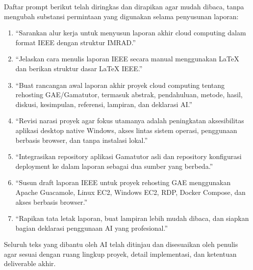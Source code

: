 \documentclass[conference]{IEEEtran}
\begin{document}
Daftar prompt berikut telah diringkas dan dirapikan agar mudah dibaca, tanpa mengubah substansi permintaan yang digunakan selama penyusunan laporan:

\begin{enumerate}
    \item ``Sarankan alur kerja untuk menyusun laporan akhir cloud computing dalam format IEEE dengan struktur IMRAD.''
    \item ``Jelaskan cara menulis laporan IEEE secara manual menggunakan LaTeX dan berikan struktur dasar LaTeX IEEE.''
    \item ``Buat rancangan awal laporan akhir proyek cloud computing tentang rehosting GAE/Gamatutor, termasuk abstrak, pendahuluan, metode, hasil, diskusi, kesimpulan, referensi, lampiran, dan deklarasi AI.''
    \item ``Revisi narasi proyek agar fokus utamanya adalah peningkatan aksesibilitas aplikasi desktop native Windows, akses lintas sistem operasi, penggunaan berbasis browser, dan tanpa instalasi lokal.''
    \item ``Integrasikan repository aplikasi Gamatutor asli dan repository konfigurasi deployment ke dalam laporan sebagai dua sumber yang berbeda.''
    \item ``Susun draft laporan IEEE untuk proyek rehosting GAE menggunakan Apache Guacamole, Linux EC2, Windows EC2, RDP, Docker Compose, dan akses berbasis browser.''
    \item ``Rapikan tata letak laporan, buat lampiran lebih mudah dibaca, dan siapkan bagian deklarasi penggunaan AI yang profesional.''
\end{enumerate}

Seluruh teks yang dibantu oleh AI telah ditinjau dan disesuaikan oleh penulis agar sesuai dengan ruang lingkup proyek, detail implementasi, dan ketentuan deliverable akhir.
\end{document}
